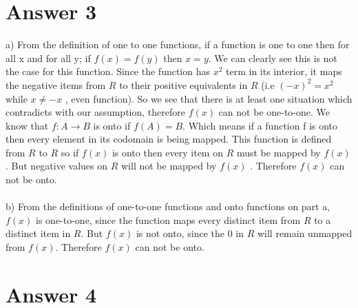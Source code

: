 \documentclass[12pt]{article}
\begin{document}
\section*{Answer 3}
\hspace*{5mm}a)	 From the definition of one to one functions, if a function is one to one then for all x and for all y; if $f(x) = f(y)$ then $x = y$. We can clearly see this is not the case for this function. Since the function has $x^2$ term in its interior, it maps the negative items from $R$ to their positive equivalents in $R$ (i.e $(-x)^2 = x^2$ while $x \neq -x$ , even function). So we see that there is at least one situation which contradicts with our assumption, therefore $f(x)$ can not be one-to-one. We know that $f : A \rightarrow B$ is onto if $f(A) = B$. Which means if a function f is onto then every element in its codomain is being mapped. This function is defined from $R$ to $R$ so if $f(x)$ is onto then every item on $R$ must be mapped by $f(x)$. But negative values on $R$ will not be mapped by $f(x)$ . Therefore $f(x)$ can not be onto.\\\\
\hspace*{5mm}b)	From the definitions of one-to-one functions and onto functions on part a, $f(x)$ is one-to-one, since the function maps every distinct item from $R$ to a distinct item in $R$. But $f(x)$ is not onto, since the $0$ in $R$ will remain unmapped from $f(x)$. Therefore $f(x)$ can not be onto.


\section*{Answer 4}
\end{document}
